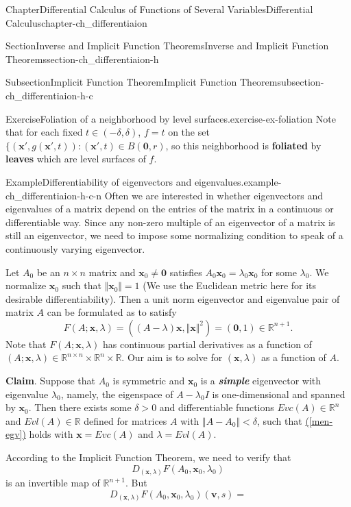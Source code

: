 \documentclass[oneside,10pt,]{book}
\newcommand{\xreffont}{\relax}
\newcommand{\alert}[1]{\textbf{\textit{#1}}}
\newcommand{\terminology}[1]{\textbf{#1}}
\numberwithin{equation}{section}
\newcommand{\bv}{\mathbf{v}}
\newcommand{\bx}{\mathbf{x}}
\newcommand{\bbR}{\mathbb{R}}
\newcommand{\lt}{<}
\begin{document}
\begin{chapterptx}{Chapter}{Differential Calculus of Functions of Several Variables}{}{Differential Calculus}{}{}{chapter-ch_differentiaion}
\begin{sectionptx}{Section}{Inverse and Implicit Function Theorems}{}{Inverse and Implicit Function Theorems}{}{}{section-ch_differentiaion-h}
\begin{subsectionptx}{Subsection}{Implicit Function Theorem}{}{Implicit Function Theorem}{}{}{subsection-ch_differentiaion-h-c}
\begin{inlineexercise}{Exercise}{Foliation of a neighborhood by level surfaces.}{exercise-ex-foliation}
Note that for each fixed \(t\in  (-\delta, \delta)\), \(f=t\) on the set \(\{(\bx', g(\bx', t)): (\bx', t)\in  B(\mathbf 0, r)\), so this neighborhood is \terminology{foliated} by \terminology{leaves} which are level surfaces of \(f\).%
\end{inlineexercise}%
\begin{example}{Example}{Differentiability of eigenvectors and eigenvalues.}{example-ch_differentiaion-h-c-n}%
Often we are interested in whether eigenvectors and eigenvalues of a matrix depend on the entries of the matrix in a continuous or differentiable way. Since any non-zero multiple of an eigenvector of a matrix is still an eigenvector, we need to impose some normalizing condition to speak of a continuously varying eigenvector.%
\par
Let \(A_{0}\) be an \(n\times n\) matrix and \(\bx_{0}\ne \mathbf 0\) satisfies \(A_{0}\bx_{0}=\lambda_{0}\bx_{0}\) for some \(\lambda_{0}\). We normalize \(\bx_{0}\) such that \(\Vert \bx_{0}\Vert=1\) (We use the Euclidean metric here for its desirable differentiability). Then a unit norm eigenvector and eigenvalue pair of matrix \(A\) can be formulated as to satisfy%
\begin{equation}
F(A; \bx, \lambda)=((A-\lambda)\bx, \Vert \bx \Vert^{2})=(\mathbf 0, 1)\in \bbR^{n+1}\text{.}\label{men-egv}
\end{equation}
Note that \(F(A; \bx, \lambda)\) has continuous partial derivatives as a function of \((A; \bx, \lambda)\in \bbR^{n\times n}\times \bbR^{n}\times \bbR\). Our aim is to solve for \((\bx, \lambda)\) as a function of \(A\).%
\par
\terminology{Claim}. Suppose that \(A_{0}\) is symmetric and \(\bx_{0}\) is a \alert{simple} eigenvector with eigenvalue \(\lambda_{0}\), namely, the eigenspace of \(A-\lambda_{0}I\) is one-dimensional and spanned by \(\bx_{0}\). Then there exists some \(\delta >0\) and differentiable functions \(Evc(A)\in \bbR^{n}\) and \(Evl(A)\in \bbR\) defined for  matrices \(A\) with \(\Vert A-A_{0}\Vert \lt \delta\), such that \hyperref[men-egv]{({\xreffont\ref{men-egv}})} holds with \(\bx=Evc(A)\) and \(\lambda=Evl(A)\).%
\par
According to the Implicit Function Theorem, we need to verify that%
\begin{equation*}
D_{(\bx, \lambda)}F(A_{0},\bx_{0},\lambda_{0})
\end{equation*}
is an invertible map of \(\bbR^{n+1}\). But%
\begin{equation*}
D_{(\bx, \lambda)}F(A_{0},\bx_{0},\lambda_{0})(\bv, s)=

\end{equation*}
\end{example}
\end{subsectionptx}
\end{sectionptx}
\end{chapterptx}
\end{document}
